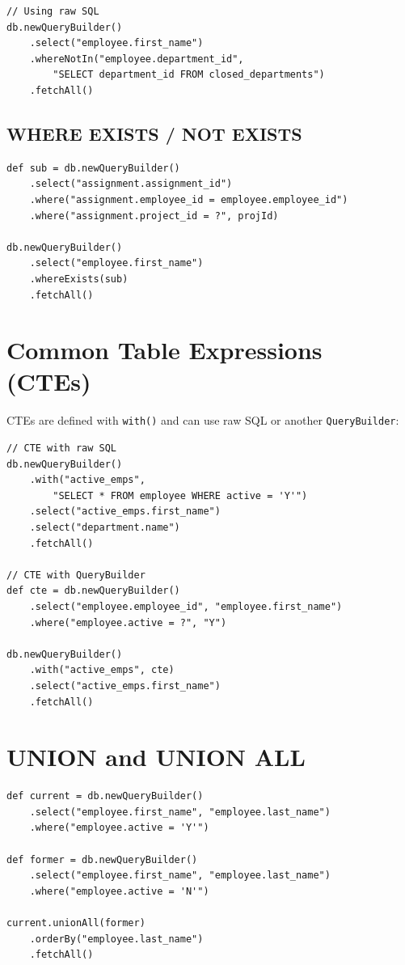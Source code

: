 \begin{lstlisting}[style=groovy]
// Using raw SQL
db.newQueryBuilder()
    .select("employee.first_name")
    .whereNotIn("employee.department_id",
        "SELECT department_id FROM closed_departments")
    .fetchAll()
\end{lstlisting}

\subsection{WHERE EXISTS / NOT EXISTS}

\begin{lstlisting}[style=groovy]
def sub = db.newQueryBuilder()
    .select("assignment.assignment_id")
    .where("assignment.employee_id = employee.employee_id")
    .where("assignment.project_id = ?", projId)

db.newQueryBuilder()
    .select("employee.first_name")
    .whereExists(sub)
    .fetchAll()
\end{lstlisting}

\section{Common Table Expressions (CTEs)}
\label{sec:qb-cte}

CTEs are defined with \texttt{with()} and can use raw SQL or another \texttt{QueryBuilder}:

\begin{lstlisting}[style=groovy]
// CTE with raw SQL
db.newQueryBuilder()
    .with("active_emps",
        "SELECT * FROM employee WHERE active = 'Y'")
    .select("active_emps.first_name")
    .select("department.name")
    .fetchAll()

// CTE with QueryBuilder
def cte = db.newQueryBuilder()
    .select("employee.employee_id", "employee.first_name")
    .where("employee.active = ?", "Y")

db.newQueryBuilder()
    .with("active_emps", cte)
    .select("active_emps.first_name")
    .fetchAll()
\end{lstlisting}

\section{UNION and UNION ALL}
\label{sec:qb-union}

\begin{lstlisting}[style=groovy]
def current = db.newQueryBuilder()
    .select("employee.first_name", "employee.last_name")
    .where("employee.active = 'Y'")

def former = db.newQueryBuilder()
    .select("employee.first_name", "employee.last_name")
    .where("employee.active = 'N'")

current.unionAll(former)
    .orderBy("employee.last_name")
    .fetchAll()
\end{lstlisting}

